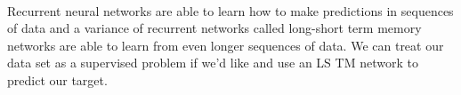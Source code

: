 \documentclass{article}
\begin{document}
    \paragraph{} 
    Recurrent neural networks are able to learn how to make predictions in sequences of data and a variance of recurrent networks called long-short term memory networks are able to learn from even longer sequences of data. We can treat our data set as a supervised problem if we'd like and use an LS TM network to predict our target.
\end{document}
